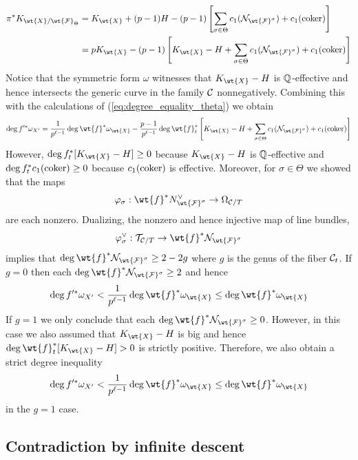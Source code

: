 \documentclass[main.tex]{subfiles}
\begin{document}
{\begin{align}
\pi^* K_{\wt{X} / \wt{\F}_{\Theta}} &= K_{\wt{X}} + (p-1) H - (p-1) \left[ \sum_{\sigma \in \Theta} c_1(\cN_{\wt{\F}^{\sigma}}) + c_1(\coker) \right]
\\
&= p K_{\wt{X}} - (p-1) \left[ K_{\wt{X}} - H + \sum_{\sigma \in \Theta} c_1(\cN_{\wt{\F}^{\sigma}}) + c_1(\coker) \right]
\end{align}
Notice that the symmetric form $\omega$ witnesses that $K_{\wt{X}} - H$ is $\mathbb{Q}$-effective and hence intersects the generic curve in the family $\mathcal{C}$ nonnegatively. Combining this with the calculations of (\ref{eq:degree_equality_theta}) we obtain
\[ \deg{f'^* \omega_{X'}} = \frac{1}{p^{\ell-1}} \deg{\wt{f}^* \omega_{\wt{X}}} - \frac{p-1}{p^{\ell-1}} \deg{\wt{f}_t^* \left[ K_{\wt{X}} - H + \sum_{\sigma \in \Theta} c_1(\cN_{\wt{\F}^{\sigma}}) + c_1(\coker) \right]} \]
However, $\deg{f_t^* [K_{\wt{X}} - H]} \ge 0$ because $K_{\wt{X}} - H$ is $\mathbb{Q}$-effective and $\deg{f_t^* c_1(\operatorname{\mathrm{coker}})} \ge 0$ because $c_1(\operatorname{\mathrm{coker}})$ is effective. Moreover, for $\sigma \in \Theta$ we showed that the maps
\[ \varphi_{\sigma} : \wt{f}^* N^{\vee}_{\wt{\F}^{\sigma}} \to \Omega_{\cC/T} \]
are each nonzero. Dualizing, the nonzero and hence injective map of line bundles,
\[ \varphi_{\sigma}^{\vee} : \cT_{\cC/T} \to \wt{f}^* \cN_{\wt{\F}^{\sigma}} \]
implies that $\deg{\wt{f}^* \cN_{\wt{\F}^{\sigma}}} \ge 2 - 2g$ where $g$ is the genus of the fiber $\mathcal{C}_t$. If $g = 0$ then each $\deg{\wt{f}^* \cN_{\wt{\F}^{\sigma}}} \ge 2$ and hence 
\[ \deg{f'^* \omega_{X'}} < \frac{1}{p^{\ell-1}} \deg{\wt{f}^* \omega_{\wt{X}}} \le \deg{\wt{f}^* \omega_{\wt{X}}} \]
If $g = 1$ we only conclude that each $\deg{\wt{f}^* \cN_{\wt{\F}^{\sigma}}} \ge 0$. However, in this case we also assumed that $K_{\wt{X}} - H$ is big and hence $\deg{\wt{f}_t^* [K_{\wt{X}} - H]} > 0$ is strictly positive. Therefore, we also obtain a strict degree inequality
\[ \deg{f'^* \omega_{X'}} < \frac{1}{p^{\ell-1}} \deg{\wt{f}^* \omega_{\wt{X}}} \le \deg{\wt{f}^* \omega_{\wt{X}}} \]
in the $g = 1$ case.

\subsection{Contradiction by infinite descent}

}
\end{document}
